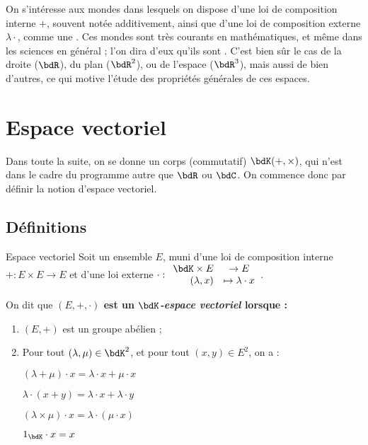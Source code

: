 \documentclass[a4paper,french,bookmarks]{article}
\begin{document}

\initcours{}

On s'intéresse aux mondes dans lesquels on dispose d'une loi de composition interne \(+\), souvent notée additivement, ainsi que d'une loi de composition externe \(\lambda \cdot\), comme une . Ces mondes sont très courants en mathématiques, et même dans les sciences en général ; l'on dira d'eux qu'ils sont . C'est bien sûr le cas de la droite ($\bdR$), du plan ($\bdR^2$), ou de l'espace ($\bdR^3$), mais aussi de bien d'autres, ce qui motive l'étude des propriétés générales de ces espaces.

\section{Espace vectoriel}

Dans toute la suite, on se donne un corps (commutatif) $\bdK(+, \times)$, qui n'est dans le cadre du programme autre que $\bdR$ ou $\bdC$. On commence donc par définir la notion d'espace vectoriel.

\subsection{Définitions}

\begin{definition}{Espace vectoriel}{}
    Soit un ensemble $E$, muni d'une loi de composition interne $+ : E \times E \to E$ et d'une loi externe $\cdot : \begin{array}{rcl}
        \bdK\times E &\to E  \\
        (\lambda, x) &\mapsto \lambda \cdot x 
    \end{array}$.
    
    On dit que \bf{$(E, +, \cdot)$ est un \textit{$\bdK$-espace vectoriel}} lorsque :
    
    \begin{enumerate}[label=\EBGaramond(\roman*)]
        \item $(E, +)$ est un groupe abélien ;
       
        \item Pour tout $(\lambda, \mu) \in \bdK^2$, et pour tout $(x, y) \in E^2$, on a :
        
        \begin{enumerate}[label=\EBGaramond\itshape\alph*.]
            \itt \( (\lambda + \mu) \cdot x = \lambda \cdot x + \mu \cdot x \)
            
            \itt \( \lambda \cdot (x + y) = \lambda \cdot x + \lambda \cdot y \)
            
            \itt \( (\lambda \times \mu) \cdot x = \lambda \cdot (\mu \cdot x)\)
            
            \itt \( 1_\bdK \cdot x = x \)
        \end{enumerate}
    \end{enumerate}
\end{definition}
\end{document}
